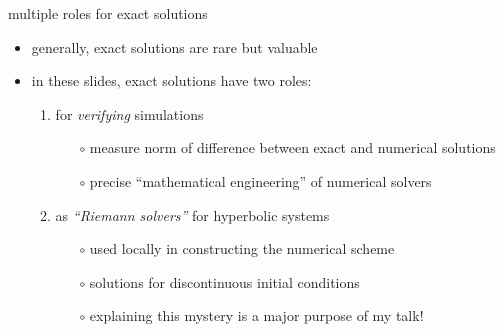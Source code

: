 \documentclass[10pt,dvipsnames,usepdftitle=false,
hyperref={pdftitle = {Finite volume methods},
    pdfauthor = {Ed Bueler}}]{beamer}
\begin{document}
\begin{frame}{multiple roles for exact solutions}

\begin{itemize}
\item generally, exact solutions are rare but valuable
\item in these slides, exact solutions have two roles:
  \begin{enumerate}
  \item for \emph{verifying} simulations
      \begin{itemize}
      \item[$\circ$] measure norm of difference between exact and numerical solutions
      \item[$\circ$] precise ``mathematical engineering'' of numerical solvers
      \end{itemize}
  \item as \emph{``Riemann solvers''} for hyperbolic systems
      \begin{itemize}
      \item[$\circ$] used locally in constructing the numerical scheme
      \item[$\circ$] solutions for discontinuous initial conditions
      \item[$\circ$] explaining this mystery is a major purpose of my talk!
      \end{itemize}
  \end{enumerate}
\end{itemize}
\end{frame}
\end{document}
